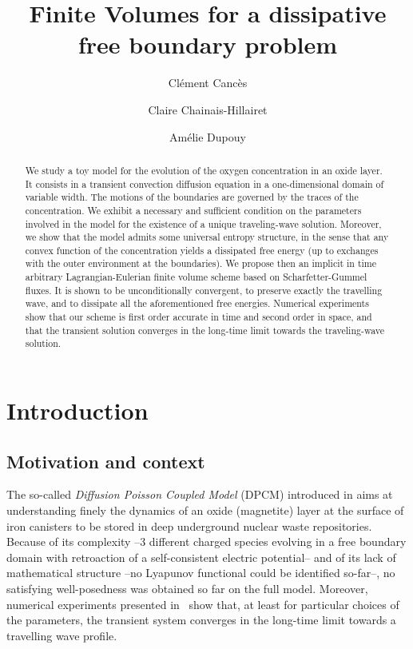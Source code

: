 \documentclass{amsart}
\title{Finite Volumes for a dissipative free boundary problem}
\author{Cl\'ement Canc\`es}
\author{Claire Chainais-Hillairet}
\author{Am\'elie Dupouy}
\begin{document}
\begin{abstract}
We study a toy model for the evolution of the oxygen concentration in an oxide layer. 
It consists in a transient convection diffusion equation in a one-dimensional domain of variable width. 
The motions of the boundaries are governed by the traces of the concentration. 
We exhibit a necessary and sufficient condition on the parameters involved in the model for the existence of a unique traveling-wave solution. 
Moreover, we show that the model admits some universal entropy structure, in the sense that any convex function of the concentration
 yields a dissipated free energy (up to exchanges with the outer environment at the boundaries).  
We propose then an implicit in time arbitrary Lagrangian-Eulerian finite volume scheme based on Scharfetter-Gummel fluxes. 
It is shown to be unconditionally convergent, to preserve exactly the travelling wave, and to dissipate all the aforementioned free energies. 
Numerical experiments show that our scheme is first order accurate in time and second order in space, and that the transient solution 
converges in the long-time limit towards the traveling-wave solution. 
\end{abstract}





\maketitle






\section{Introduction}

\subsection{Motivation and context}


The so-called  \textit{Diffusion  Poisson Coupled Model} (DPCM) introduced in \cite{Bataillon_elec} aims at understanding finely the dynamics of an oxide (magnetite) layer at the 
surface of iron canisters to be stored in deep underground nuclear waste repositories. Because of its complexity --3 different charged species evolving in a free boundary domain with retroaction of a self-consistent electric potential-- and of its lack of mathematical structure --no Lyapunov functional could be identified so-far--, no satisfying well-posedness was obtained so far on the full model. Moreover, numerical experiments presented in~\cite{Bataillon_elec, Calipso} show that, at least for particular choices of the parameters, the transient system converges in the long-time limit towards a travelling wave profile. 
\end{document}
